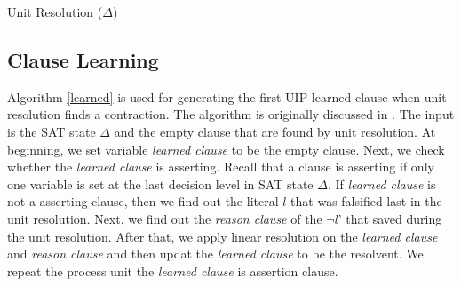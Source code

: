 \documentclass[11pt]{llncs}
\begin{document}
\begin{algorithm}[H]
\label{unit}
\caption{Unit Resolution ($\Delta$)}

  


\BlankLine

\KwRet \True
\end{algorithm}







\subsection{Clause Learning}
Algorithm \ref{learned} is used for generating the first UIP learned clause when unit resolution finds a contraction.
The algorithm is originally discussed in \cite{notes}.
The input is the SAT state $\Delta$ and the empty clause that are found by unit resolution.
At beginning, we set variable \emph{learned clause} to be the empty clause.
Next, we check whether the \emph{learned clause} is asserting.
Recall that a clause is asserting if only one variable is set at the last decision level in SAT state $\Delta$.
If \emph{learned clause} is not a asserting clause, then we find out the literal $l$ that was falsified last in the unit resolution.
Next, we find out the \emph{reason clause} of the $\neg l$' that saved during the unit resolution.
After that, we apply linear resolution on the \emph{learned clause} and \emph{reason clause} and then updat the \emph{learned clause} to be the resolvent.
We repeat the process unit the \emph{learned clause} is assertion clause.
\end{document}
